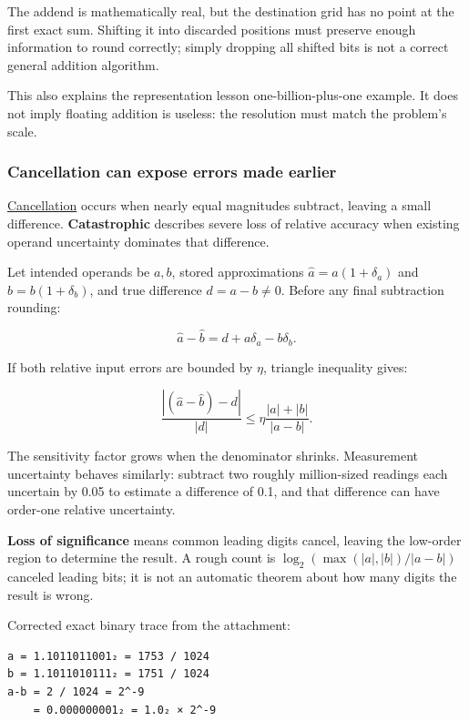 The addend is mathematically real, but the destination grid has no point at the first exact sum. Shifting it into discarded positions must preserve enough information to round correctly; simply dropping all shifted bits is not a correct general addition algorithm.

This also explains the representation lesson one-billion-plus-one example. It does not imply floating addition is useless: the resolution must match the problem's scale.

\subsubsection{Cancellation can expose errors made earlier}\label{05-engine-i-ch001-cancellation-can-expose-errors-made-earlier}

\hyperref[appendix-a2773a6a2f9d]{Cancellation} occurs when nearly equal magnitudes subtract, leaving a small difference. \textbf{Catastrophic} describes severe loss of relative accuracy when existing operand uncertainty dominates that difference.

Let intended operands be \(a,b\), stored approximations \(\widehat a=a(1+\delta_a)\) and \(\widehat b=b(1+\delta_b)\), and true difference \(d=a-b\ne0\). Before any final subtraction rounding:

\[
\widehat a-\widehat b=d+a\delta_a-b\delta_b.
\]

If both relative input errors are bounded by \(\eta\), triangle inequality gives:

\[
\frac{|(\widehat a-\widehat b)-d|}{|d|}
\le\eta\frac{|a|+|b|}{|a-b|}.
\]

The sensitivity factor grows when the denominator shrinks. Measurement uncertainty behaves similarly: subtract two roughly million-sized readings each uncertain by 0.05 to estimate a difference of 0.1, and that difference can have order-one relative uncertainty.

\textbf{Loss of significance} means common leading digits cancel, leaving the low-order region to determine the result. A rough count is \(\log_2(\max(|a|,|b|)/|a-b|)\) canceled leading bits; it is not an automatic theorem about how many digits the result is wrong.

Corrected exact binary trace from the attachment:

\begin{verbatim}
a = 1.1011011001₂ = 1753 / 1024
b = 1.1011010111₂ = 1751 / 1024
a-b = 2 / 1024 = 2^-9
    = 0.000000001₂ = 1.0₂ × 2^-9
\end{verbatim}

